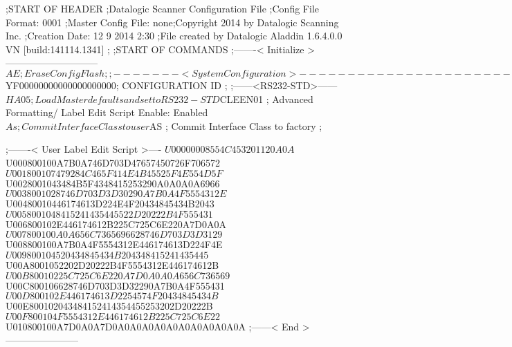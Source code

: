 ;START OF HEADER
;Datalogic Scanner Configuration File
;Config File Format: 0001
;Master Config File: none;Copyright 2014 by Datalogic Scanning Inc.
;Creation Date: 12 9 2014 2:30
;File created by Datalogic Aladdin 1.6.4.0.0 VN [build:141114.1341]
;
;START OF COMMANDS
;-------< Initialize >-----------------------------
$AE                 ; Erase Config Flash
;
;-------< System Configuration >-------------------------------
$YF00000000000000000000; CONFIGURATION ID
;
;------<RS232-STD>------
$HA05               ; Load Master defaults and set to RS232-STD
$CLEEN01            ; Advanced Formatting/ Label Edit Script Enable: Enabled
$As                 ; Commit Interface Class to user
$AS                 ; Commit Interface Class to factory
;

;-------< User Label Edit Script >----
$U00000008554C453201120A0A
$U000800100A7B0A746D703D47657450726F706572
$U001800107479284C465F414E4B45525F4E554D5F
$U0028001043484B5F4348415253290A0A0A0A6966
$U0038001028746D703D3D30290A7B0A4F5554312E
$U00480010446174613D224E4F20434845434B2043
$U0058001048415241435445522D20222B4F555431
$U006800102E446174612B225C725C6E220A7D0A0A
$U007800100A0A656C7365696628746D703D3D3129
$U008800100A7B0A4F5554312E446174613D224F4E
$U009800104520434845434B204348415241435445
$U00A8001052202D20222B4F5554312E446174612B
$U00B80010225C725C6E220A7D0A0A0A656C736569
$U00C800106628746D703D3D32290A7B0A4F555431
$U00D800102E446174613D2254574F20434845434B
$U00E800102043484152414354455253202D20222B
$U00F800104F5554312E446174612B225C725C6E22
$U010800100A7D0A0A7D0A0A0A0A0A0A0A0A0A0A0A
;------< End >-----------------------
